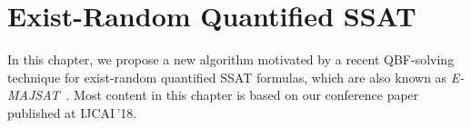 \chapter{Exist-Random Quantified SSAT}
\label{chap:exist-random-ssat}

In this chapter, we propose a new algorithm motivated by a recent QBF-solving technique for exist-random quantified SSAT formulas, which are also known as \textit{E-MAJSAT}~\cite{Littman1998}.
Most content in this chapter is based on our conference paper~\cite{LeeIJCAI18ERSSAT} published at IJCAI\,'18.



